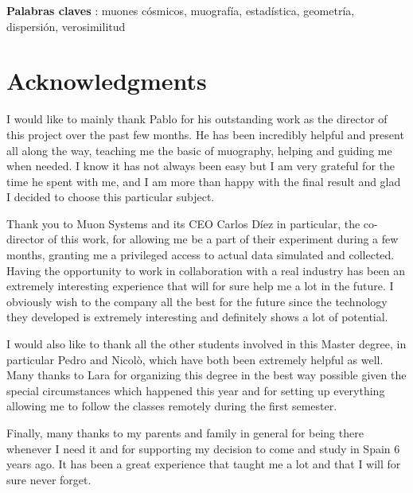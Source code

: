 \documentclass[a4paper, 11pt, twoside, openright]{report}
\begin{document}
\begin{center}
\textbf{Palabras claves} : muones c\'osmicos, muograf\'ia, estad\'istica, geometr\'ia, dispersi\'on, verosimilitud
\end{center} \vfill

\newpage


\section*{\huge{Acknowledgments}}

I would like to mainly thank Pablo for his outstanding work as the director of this project over the past few months. He has been incredibly helpful and present all along the way, teaching me the basic of muography, helping and guiding me when needed. I know it has not always been easy but I am very grateful for the time he spent with me, and I am more than happy with the final result and glad I decided to choose this particular subject.

Thank you to Muon Systems and its CEO Carlos D\'iez in particular, the co-director of this work, for allowing me be a part of their experiment during a few months, granting me a privileged access to actual data simulated and collected. Having the opportunity to work in collaboration with a real industry has been an extremely interesting experience that will for sure help me a lot in the future. I obviously wish to the company all the best for the future since the technology they developed is extremely interesting and definitely shows a lot of potential.

I would also like to thank all the other students involved in this Master degree, in particular Pedro and Nicol\`o, which have both been extremely helpful as well. Many thanks to Lara for organizing this degree in the best way possible given the special circumstances which happened this year and for setting up everything allowing me to follow the classes remotely during the first semester.

Finally, many thanks to my parents and family in general for being there whenever I need it and for supporting my decision to come and study in Spain 6 years ago. It has been a great experience that taught me a lot and that I will for sure never forget.  

\end{document}
